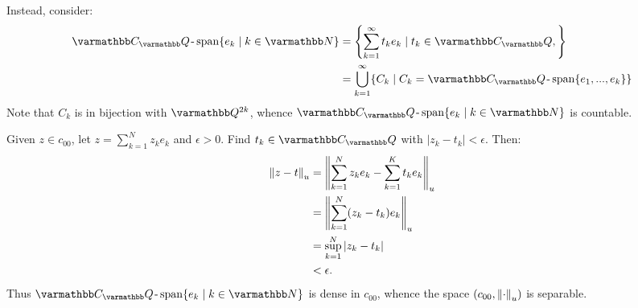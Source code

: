 \begin{example}
\begin{enumerate}[label = (\arabic*),itemsep=1pt,topsep=3pt]
            Instead, consider:
                \begin{equation*}
                \begin{split}
                    \bfC_\bfQ\text{\h1-}\Span\{e_k \mid k \in \bfN \}
                    & = \left\{ \sum_{k = 1}^\infty t_k e_k \mid t_k \in \bfC_\bfQ,  \right\} \\
                    & = \bigcup_{k = 1}^\infty \{C_k \mid C_k = \bfC_\bfQ\text{\h1-}\Span\{e_1,...,e_k\}\}
                \end{split}
                \end{equation*}
            Note that $C_k$ is in bijection with $\bfQ^{2k}$, whence $\bfC_\bfQ\text{\h1-}\Span\{e_k \mid k \in \bfN \}$ is countable.

            Given $z \in c_{00}$, let $z = \sum_{k = 1}^N z_k e_k$ and $\epsilon > 0$. Find $t_k \in \bfC_\bfQ$ with $|z_k - t_k| < \epsilon$. Then:
                \begin{equation*}
                \begin{split}
                    \left\lVert z - t \right\rVert_u 
                    & = \left\lVert \sum_{k = 1}^N z_k e_k - \sum_{k = 1}^K t_k e_k \right\rVert_u \\
                    & = \left\lVert \sum_{k = 1}^N (z_k - t_k)e_k \right\rVert_u \\
                    & = \sup_{k = 1}^N |z_k - t_k| \\
                    & < \epsilon.
                \end{split}
                \end{equation*}
            Thus $\bfC_\bfQ\text{\h1-}\Span\{e_k \mid k \in \bfN \}$ is dense in $c_{00}$, whence the space $(c_{00},\left\lVert \cdot \right\rVert_u)$ is separable.
        \end{enumerate}
    \end{example}

